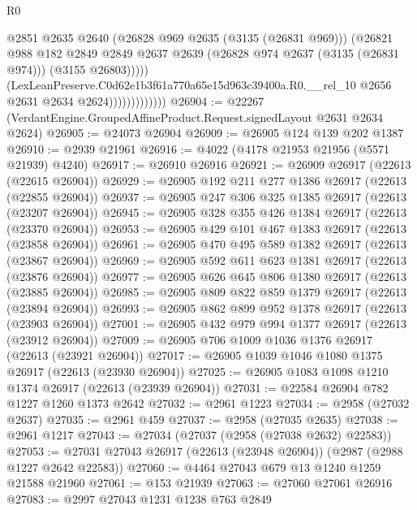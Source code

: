 \begin{lexlean}{R0}
\begin{coremodule}
                                  @2851
                                  @2635
                                  @2640
                                  (@26828 @969 @2635 (@3135 (@26831 @969)))
                                  (@26821
                                    @988
                                    @182
                                    @2849
                                    @2849
                                    @2637
                                    @2639
                                    (@26828 @974 @2637 (@3135 (@26831 @974)))
                                    (@3155 @26803)))))
                            (LexLeanPreserve.C0d62e1b3f61a770a65e15d963c39400a.R0.__rel_10
                              @2656
                              @2631
                              @2634
                              @2624)))))))))))))
@26904 := @22267 (VerdantEngine.GroupedAffineProduct.Request.signedLayout @2631 @2634 @2624)
@26905 := @24073 @26904
@26909 := @26905 @124 @139 @202 @1387
@26910 := @2939 @21961
@26916 := @4022 (@4178 @21953 @21956 (@5571 @21939) @4240)
@26917 := @26910 @26916
@26921 := @26909 @26917 (@22613 (@22615 @26904))
@26929 := @26905 @192 @211 @277 @1386 @26917 (@22613 (@22855 @26904))
@26937 := @26905 @247 @306 @325 @1385 @26917 (@22613 (@23207 @26904))
@26945 := @26905 @328 @355 @426 @1384 @26917 (@22613 (@23370 @26904))
@26953 := @26905 @429 @101 @467 @1383 @26917 (@22613 (@23858 @26904))
@26961 := @26905 @470 @495 @589 @1382 @26917 (@22613 (@23867 @26904))
@26969 := @26905 @592 @611 @623 @1381 @26917 (@22613 (@23876 @26904))
@26977 := @26905 @626 @645 @806 @1380 @26917 (@22613 (@23885 @26904))
@26985 := @26905 @809 @822 @859 @1379 @26917 (@22613 (@23894 @26904))
@26993 := @26905 @862 @899 @952 @1378 @26917 (@22613 (@23903 @26904))
@27001 := @26905 @432 @979 @994 @1377 @26917 (@22613 (@23912 @26904))
@27009 := @26905 @706 @1009 @1036 @1376 @26917 (@22613 (@23921 @26904))
@27017 := @26905 @1039 @1046 @1080 @1375 @26917 (@22613 (@23930 @26904))
@27025 := @26905 @1083 @1098 @1210 @1374 @26917 (@22613 (@23939 @26904))
@27031 := @22584 @26904 @782 @1227 @1260 @1373 @2642
@27032 := @2961 @1223
@27034 := @2958 (@27032 @2637)
@27035 := @2961 @459
@27037 := @2958 (@27035 @2635)
@27038 := @2961 @1217
@27043 := @27034 (@27037 (@2958 (@27038 @2632) @22583))
@27053 := @27031 @27043 @26917 (@22613 (@23948 @26904)) (@2987 (@2988 @1227 @2642 @22583))
@27060 := @4464 @27043 @679 @13 @1240 @1259 @21588 @21960
@27061 := @153 @21939
@27063 := @27060 @27061 @26916
@27083 := @2997
    @27043
    @1231
    @1238
    @763
    @2849

\end{coremodule}
\end{lexlean}
